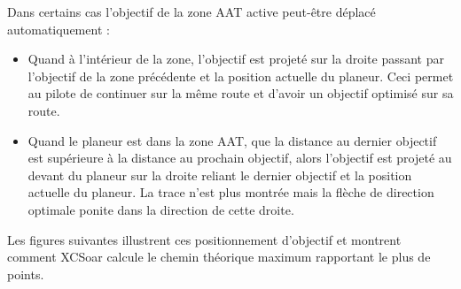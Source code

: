 Dans certains cas l'objectif de la zone AAT active peut-être déplacé automatiquement :
\begin{itemize}
\item Quand à l'intérieur de la zone, l'objectif est projeté sur la droite passant par l'objectif de la zone précédente et la position actuelle du planeur. Ceci permet au pilote de continuer sur la même route et d'avoir un objectif optimisé sur sa route.
\item Quand le planeur est dans la zone AAT, que la distance au dernier objectif est supérieure à la distance au prochain objectif, alors l'objectif est projeté au devant du planeur sur la droite reliant le dernier objectif et la position actuelle du planeur. La trace n'est plus montrée mais la flèche de direction optimale ponite dans la direction de cette droite.
\end{itemize}

Les figures suivantes illustrent ces positionnement d'objectif et montrent comment XCSoar calcule le chemin théorique maximum rapportant le plus de points.

